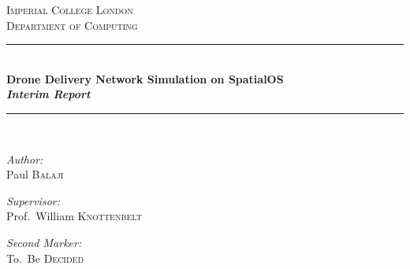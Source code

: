 \documentclass[a4paper,12pt,titlepage]{article}
\begin{document}
\newcount\colveccount
\newcommand*\colvec[1]{
        \global\colveccount#1
        \begin{pmatrix}
        \colvecnext
}
\def\colvecnext#1{
        #1
        \global\advance\colveccount-1
        \ifnum\colveccount>0
                \\
                \expandafter\colvecnext
        \else
                \end{pmatrix}
        \fi
}

\begin{titlepage}

\newcommand{\HRule}{\rule{\linewidth}{0.5mm}} %
\setlength{\topmargin}{0in}
\center %



\textsc{\LARGE Imperial College London}\\[1.5cm] %
\textsc{\Large Department of Computing}\\[0.5cm] %


\HRule \\[0.4cm]
{ \huge \bfseries Drone Delivery Network Simulation on SpatialOS\\\textit{Interim Report}}\\[0.4cm] %
\HRule \\[0.4cm]


\begin{minipage}[t]{0.4\textwidth}
\begin{flushleft} \large
\emph{Author:}\\
Paul \textsc{Balaji} \\
\end{flushleft}
\end{minipage}
\begin{minipage}[t]{0.5\textwidth}
\begin{flushright} \large
\emph{Supervisor:} \\
Prof.~William \textsc{Knottenbelt}
\end{flushright}
\begin{flushright} \large
\emph{Second Marker:} \\
To.~Be \textsc{Decided}
\end{flushright}
\end{minipage}\\[1cm]


\end{titlepage}
\end{document}
